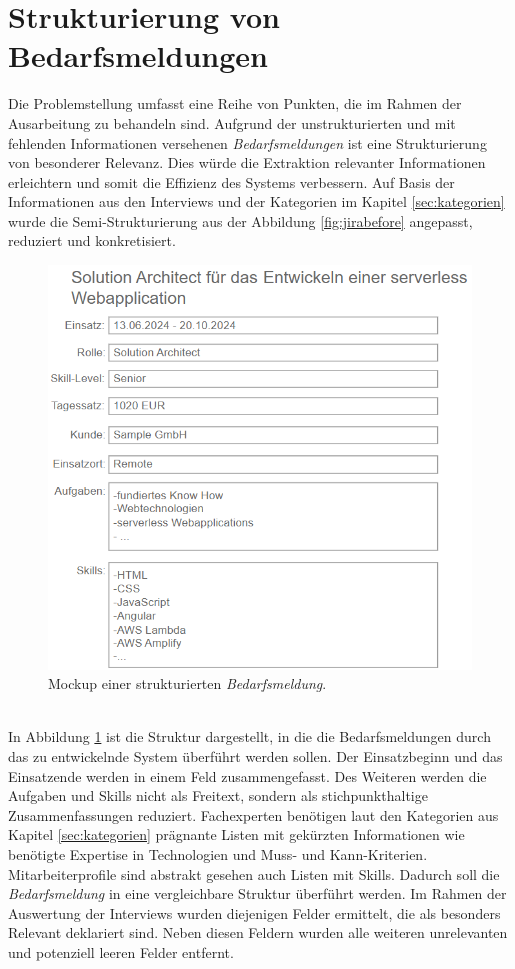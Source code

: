 \section{Strukturierung von Bedarfsmeldungen}
\label{sec:strukturierungbedarfsmeldung}
Die Problemstellung umfasst eine Reihe von Punkten, die im Rahmen der Ausarbeitung zu behandeln sind. Aufgrund der unstrukturierten und mit fehlenden Informationen versehenen \emph{Bedarfsmeldungen} ist eine Strukturierung von besonderer Relevanz. Dies würde die Extraktion relevanter Informationen erleichtern und somit die Effizienz des Systems verbessern. Auf Basis der Informationen aus den Interviews und der Kategorien im Kapitel \ref{sec:kategorien} wurde die Semi-Strukturierung aus der Abbildung \ref{fig:jirabefore} angepasst, reduziert und konkretisiert.
\begin{figure}[H]%
	\centering  
	\includegraphics[scale=1]{Abbildungen/jiraAfter.png}
	\caption{Mockup einer strukturierten \emph{Bedarfsmeldung}.}
	\label{fig:jiraafter}
\end{figure}\mbox{} \\
In Abbildung \ref{fig:jiraafter} ist die Struktur dargestellt, in die die Bedarfsmeldungen durch das zu entwickelnde System überführt werden sollen. Der Einsatzbeginn und das Einsatzende werden in einem Feld zusammengefasst. Des Weiteren werden die Aufgaben und Skills nicht als Freitext, sondern als stichpunkthaltige Zusammenfassungen reduziert. Fachexperten benötigen laut den Kategorien aus Kapitel \ref{sec:kategorien} prägnante Listen mit gekürzten Informationen wie benötigte Expertise in Technologien und Muss- und Kann-Kriterien. Mitarbeiterprofile sind abstrakt gesehen auch Listen mit Skills. Dadurch soll die \emph{Bedarfsmeldung} in eine vergleichbare Struktur überführt werden. Im Rahmen der Auswertung der Interviews wurden diejenigen Felder ermittelt, die als besonders Relevant deklariert sind. Neben diesen Feldern wurden alle weiteren unrelevanten und potenziell leeren Felder entfernt.\\
